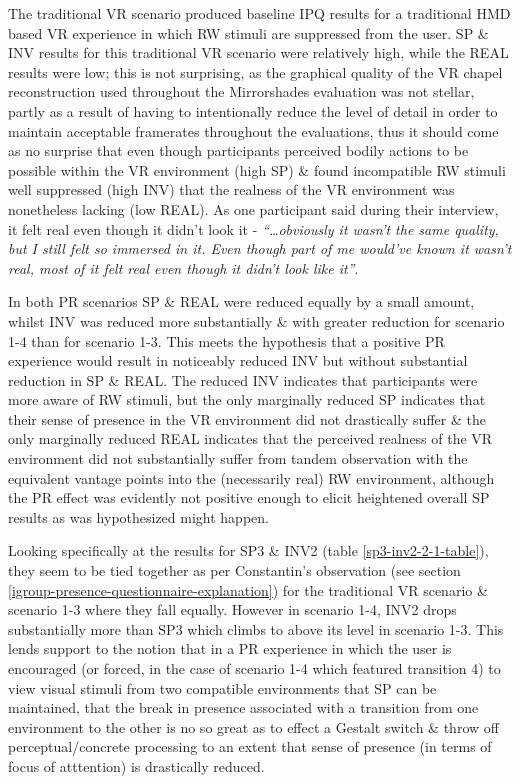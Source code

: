 The traditional VR scenario produced baseline IPQ results for a traditional HMD based VR experience in which RW stimuli are suppressed from the user. SP \& INV results for this traditional VR scenario were relatively high, while the REAL results were low; this is not surprising, as the graphical quality of the VR chapel reconstruction used throughout the Mirrorshades evaluation was not stellar, partly as a result of having to intentionally reduce the level of detail in order to maintain acceptable framerates throughout the evaluations, thus it should come as no surprise that even though participants perceived bodily actions to be possible within the VR environment (high SP) \& found incompatible RW stimuli well suppressed (high INV) that the realness of the VR environment was nonetheless lacking (low REAL). As one participant said during their interview, it felt real even though it didn't look it - \textit{``\ldots obviously it wasn't the same quality, but I still felt so immersed in it. Even though part of me would've known it wasn't real, most of it felt real even though it didn't look like it''}.

In both PR scenarios SP \& REAL were reduced equally by a small amount, whilst INV was reduced more substantially \& with greater reduction for scenario 1-4 than for scenario 1-3. This meets the hypothesis that a positive PR experience would result in noticeably reduced INV but without substantial reduction in SP \& REAL. The reduced INV indicates that participants were more aware of RW stimuli, but the only marginally reduced SP indicates that their sense of presence in the VR environment did not drastically suffer \& the only marginally reduced REAL indicates that the perceived realness of the VR environment did not substantially suffer from tandem observation with the equivalent vantage points into the (necessarily real) RW environment, although the PR effect was evidently not positive enough to elicit heightened overall SP results as was hypothesized might happen.

Looking specifically at the results for SP3 \& INV2 (table \ref{sp3-inv2-2-1-table}), they seem to be tied together as per Constantin's observation (see section \ref{igroup-presence-questionnaire-explanation}) for the traditional VR scenario \& scenario 1-3 where they fall equally. However in scenario 1-4, INV2 drops substantially more than SP3 which climbs to above its level in scenario 1-3. This lends support to the notion that in a PR experience in which the user is encouraged (or forced, in the case of scenario 1-4 which featured transition 4) to view visual stimuli from two compatible environments that SP can be maintained, that the break in presence associated with a transition from one environment to the other is no so great as to effect a Gestalt switch \& throw off perceptual/concrete processing to an extent that sense of presence (in terms of focus of atttention) is drastically reduced.

